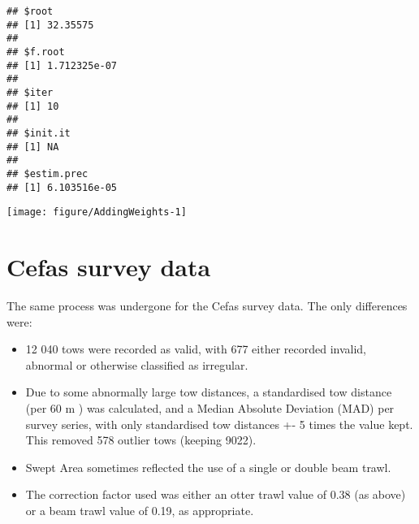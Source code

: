 \documentclass[12pt]{article}\usepackage[]{graphicx}\usepackage[]{color}
\makeatletter
\def\maxwidth{ %
  \ifdim\Gin@nat@width>\linewidth
    \linewidth
  \else
    \Gin@nat@width
  \fi
}
\newenvironment{kframe}{%
 \def\at@end@of@kframe{}%
 \ifinner\ifhmode%
  \def\at@end@of@kframe{\end{minipage}}%
  \begin{minipage}{\columnwidth}%
 \fi\fi%
 \def\FrameCommand##1{\hskip\@totalleftmargin \hskip-\fboxsep
 \colorbox{shadecolor}{##1}\hskip-\fboxsep
     \hskip-\linewidth \hskip-\@totalleftmargin \hskip\columnwidth}%
 \MakeFramed {\advance\hsize-\width
   \@totalleftmargin\z@ \linewidth\hsize
   \@setminipage}}%
 {\par\unskip\endMakeFramed%
 \at@end@of@kframe}
\newenvironment{knitrout}{}{} %
\makeatother
\begin{document}
\begin{knitrout}\footnotesize
{}\color{fgcolor}\begin{kframe}
\begin{verbatim}
## $root
## [1] 32.35575
## 
## $f.root
## [1] 1.712325e-07
## 
## $iter
## [1] 10
## 
## $init.it
## [1] NA
## 
## $estim.prec
## [1] 6.103516e-05
\end{verbatim}
\end{kframe}

{\centering \texttt{[image: figure/AddingWeights-1]} 

}


\begin{kframe}

{\ttfamily\noindent\itshape{}}\end{kframe}
\end{knitrout}

\section{Cefas survey data}

The same process was undergone for the Cefas survey data. The only differences
were:

\begin{itemize}
	\item 12 040 tows were recorded as valid, with 677 either recorded
		invalid, abnormal or otherwise classified as irregular.
	\item Due to some abnormally large tow distances, a standardised tow
		distance (per 60 m ) was calculated, and a Median Absolute
		Deviation (MAD) per survey series, with only standardised tow
		distances +- 5 times the value kept. This removed 578 outlier
		tows (keeping 9022).
	\item Swept Area sometimes reflected the use of a single or double beam
		trawl.
	\item The correction factor used was either an otter trawl value of
		0.38 (as above) or a beam trawl value of 0.19, as appropriate.
\end{itemize}




\end{document}

